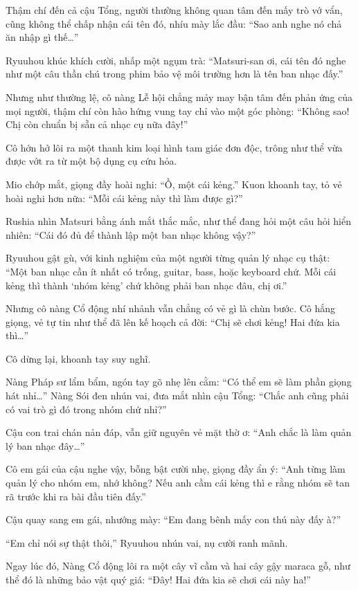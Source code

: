 \documentclass[../main.tex]{subfiles}
\begin{document}
Thậm chí đến cả cậu Tổng, người thường không quan tâm đến mấy trò vớ vẩn, cũng không thể chấp nhận cái tên đó, nhíu mày lắc đầu: ``Sao anh nghe nó chả ăn nhập gì thế\dots''

Ryuuhou khúc khích cười, nhấp một ngụm trà: ``Matsuri-san ơi, cái tên đó nghe như một câu thần chú trong phim bảo vệ môi trường hơn là tên ban nhạc đấy.''

Nhưng như thường lệ, cô nàng Lễ hội chẳng mảy may bận tâm đến phản ứng của mọi người, thậm chí còn hào hứng vung tay chỉ vào một góc phòng: ``Không sao! Chị còn chuẩn bị sẵn cả nhạc cụ nữa đây!''

Cô hớn hở lôi ra một thanh kim loại hình tam giác đơn độc, trông như thể vừa được vớt ra từ một bộ dụng cụ cứu hỏa.


Mio chớp mắt, giọng đầy hoài nghi: ``Ồ, một cái kẻng.'' Kuon khoanh tay, tỏ vẻ hoài nghi hơn nữa: ``Mỗi cái kẻng này thì làm được gì?''

Rushia nhìn Matsuri bằng ánh mắt thắc mắc, như thể đang hỏi một câu hỏi hiển nhiên: ``Cái đó đủ để thành lập một ban nhạc không vậy?''

Ryuuhou gật gù, với kinh nghiệm của một người từng quản lý nhạc cụ thật: ``Một ban nhạc cần ít nhất có trống, guitar, bass, hoặc keyboard chứ. Mỗi cái kẻng thì thành `nhóm kẻng' chứ không phải ban nhạc đâu, chị ơi.''

Nhưng cô nàng Cổ động nhí nhảnh vẫn chẳng có vẻ gì là chùn bước. Cô hắng giọng, vẻ tự tin như thể đã lên kế hoạch cả đời: ``Chị sẽ chơi kẻng! Hai đứa kia thì\dots''

Cô dừng lại, khoanh tay suy nghĩ.

Nàng Pháp sư lẩm bẩm, ngón tay gõ nhẹ lên cằm: ``Có thể em sẽ làm phần giọng hát nhỉ\dots'' Nàng Sói đen nhún vai, đưa mắt nhìn cậu Tổng: ``Chắc anh cũng phải có vai trò gì đó trong nhóm chứ nhỉ?''

Cậu con trai chán nản đáp, vẫn giữ nguyên vẻ mặt thờ ơ: ``Anh chắc là làm quản lý ban nhạc đây\dots''

Cô em gái của cậu nghe vậy, bỗng bật cười nhẹ, giọng đầy ẩn ý: ``Anh từng làm quản lý cho nhóm em, nhớ không? Nếu anh cầm cái kẻng thì e rằng nhóm sẽ tan rã trước khi ra bài đầu tiên đấy.''

Cậu quay sang em gái, nhướng mày: ``Em đang bênh mấy con thú này đấy à?''

``Em chỉ nói sự thật thôi,'' Ryuuhou nhún vai, nụ cười ranh mãnh.

Ngay lúc đó, Nàng Cổ động lôi ra một cây vĩ cầm và hai cây gậy maraca gỗ, như thể đó là những bảo vật quý giá: ``Đây! Hai đứa kia sẽ chơi cái này ha!''
\end{document}
